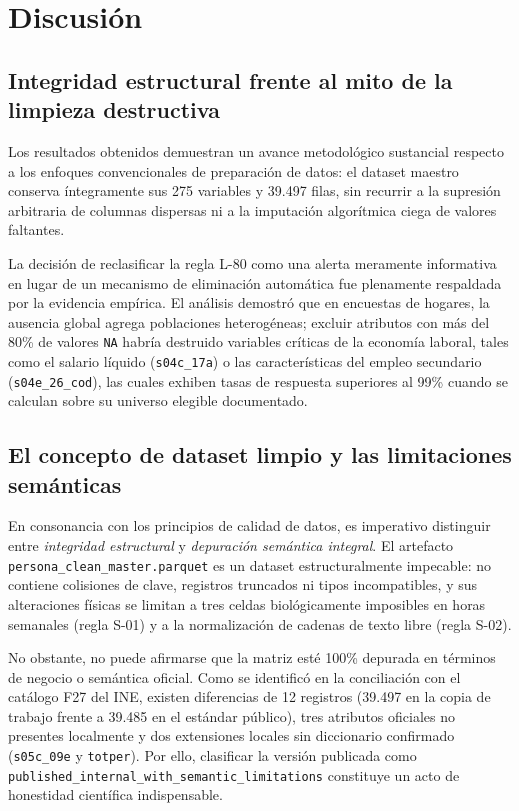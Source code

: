 \section{Discusión}

\subsection{Integridad estructural frente al mito de la limpieza destructiva}
Los resultados obtenidos demuestran un avance metodológico sustancial respecto a los enfoques convencionales de preparación de datos: el dataset maestro conserva íntegramente sus 275 variables y 39.497 filas, sin recurrir a la supresión arbitraria de columnas dispersas ni a la imputación algorítmica ciega de valores faltantes. 

La decisión de reclasificar la regla L-80 como una alerta meramente informativa en lugar de un mecanismo de eliminación automática fue plenamente respaldada por la evidencia empírica. El análisis demostró que en encuestas de hogares, la ausencia global agrega poblaciones heterogéneas; excluir atributos con más del 80\% de valores \texttt{NA} habría destruido variables críticas de la economía laboral, tales como el salario líquido (\texttt{s04c\_17a}) o las características del empleo secundario (\texttt{s04e\_26\_cod}), las cuales exhiben tasas de respuesta superiores al 99\% cuando se calculan sobre su universo elegible documentado.

\subsection{El concepto de dataset limpio y las limitaciones semánticas}
En consonancia con los principios de calidad de datos, es imperativo distinguir entre \textit{integridad estructural} y \textit{depuración semántica integral}. El artefacto \texttt{persona\_clean\_master.parquet} es un dataset estructuralmente impecable: no contiene colisiones de clave, registros truncados ni tipos incompatibles, y sus alteraciones físicas se limitan a tres celdas biológicamente imposibles en horas semanales (regla S-01) y a la normalización de cadenas de texto libre (regla S-02). 

No obstante, no puede afirmarse que la matriz esté 100\% depurada en términos de negocio o semántica oficial. Como se identificó en la conciliación con el catálogo F27 del INE, existen diferencias de 12 registros (39.497 en la copia de trabajo frente a 39.485 en el estándar público), tres atributos oficiales no presentes localmente y dos extensiones locales sin diccionario confirmado (\texttt{s05c\_09e} y \texttt{totper}). Por ello, clasificar la versión publicada como \texttt{published\_internal\_with\_semantic\_limitations} constituye un acto de honestidad científica indispensable.

